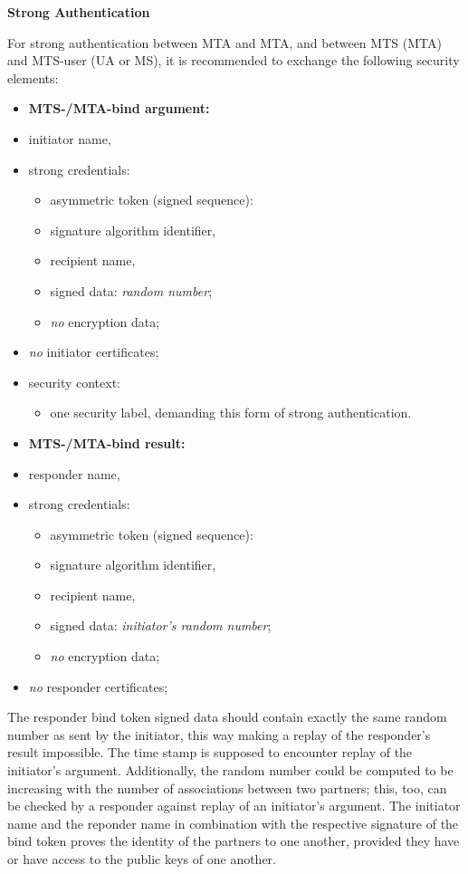 {\bf Strong Authentication}
\label{isw-sa}

For strong authentication between MTA and MTA,
and between MTS (MTA) and MTS-user (UA or MS),
it is recommended to exchange the following security elements:

\begin{itemize}
\item {\bf MTS-/MTA-bind argument:}
\item initiator name,
\item strong credentials:
\begin{itemize}
\item asymmetric token (signed sequence):
\item signature algorithm identifier,
\item recipient name,
\item signed data: {\em random number};
\item {\em no} encryption data;
\end{itemize}
\item {\em no} initiator certificates;
\item security context:
\begin{itemize}
\item one security label, demanding this form of strong authentication.
\end{itemize}
\end{itemize}

\begin{itemize}
\item {\bf MTS-/MTA-bind result:}
\item responder name,
\item strong credentials:
\begin{itemize}
\item asymmetric token (signed sequence):
\item signature algorithm identifier,
\item recipient name,
\item signed data: {\em initiator's random number};
\item {\em no} encryption data;
\end{itemize}
\item {\em no} responder certificates;
\end{itemize}

The responder bind token signed data should contain
exactly the same random number as sent by the initiator,
this way making a replay of the responder's result impossible.
The time stamp is supposed to encounter replay of the
initiator's argument. Additionally, the random number
could be computed to be increasing with the number
of associations between two partners; this, too, can be checked
by a responder against replay of an initiator's argument.
The initiator name and the reponder name in combination with
the respective signature of the bind token
proves the identity of the partners to one another,
provided they have or have access to the public keys of one another.

